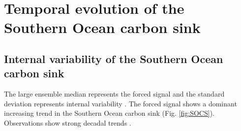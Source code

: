 \chapter{Temporal evolution of the Southern Ocean carbon sink}\label{ch:temporal} %

\section{Internal variability of the Southern Ocean carbon sink}

\citep{landschuetzer2015}

The large ensemble median represents the forced signal and the standard deviation represents internal variability \citep{Deser2012}. The forced signal shows a dominant increasing trend in the Southern Ocean carbon sink (Fig. \ref{fig:SOCS}). Observations show strong decadal trends \citep{landschuetzer2015}.

